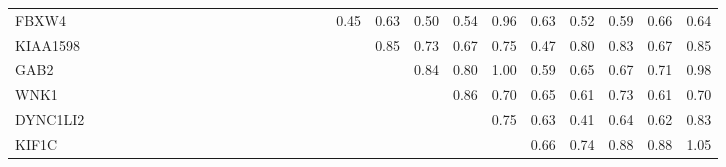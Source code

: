 \begin{longtable}{lrrrrrrrrrrrrrrrrrrrrrrrrrrr}
FBXW4    &              &              &            &            &            &            &               &            &              &             &               &            &             &             &             &              &             &           0.45 &       0.63 &       0.50 &           0.54 &        0.96 &          0.63 &        0.52 &      0.59 &           0.66 &        0.64 \\
KIAA1598 &              &              &            &            &            &            &               &            &              &             &               &            &             &             &             &              &             &                &       0.85 &       0.73 &           0.67 &        0.75 &          0.47 &        0.80 &      0.83 &           0.67 &        0.85 \\
GAB2     &              &              &            &            &            &            &               &            &              &             &               &            &             &             &             &              &             &                &            &       0.84 &           0.80 &        1.00 &          0.59 &        0.65 &      0.67 &           0.71 &        0.98 \\
WNK1     &              &              &            &            &            &            &               &            &              &             &               &            &             &             &             &              &             &                &            &            &           0.86 &        0.70 &          0.65 &        0.61 &      0.73 &           0.61 &        0.70 \\
DYNC1LI2 &              &              &            &            &            &            &               &            &              &             &               &            &             &             &             &              &             &                &            &            &                &        0.75 &          0.63 &        0.41 &      0.64 &           0.62 &        0.83 \\
KIF1C    &              &              &            &            &            &            &               &            &              &             &               &            &             &             &             &              &             &                &            &            &                &             &          0.66 &        0.74 &      0.88 &           0.88 &        1.05 \\

\end{longtable}
